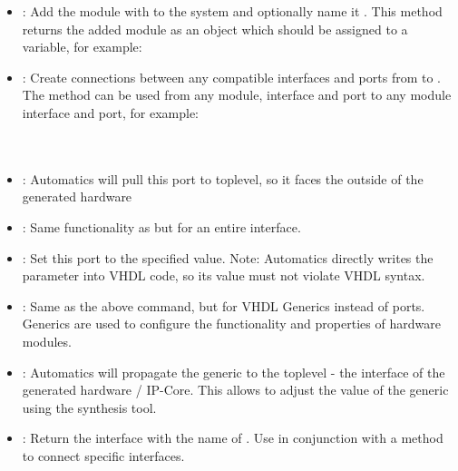 \begin{itemize}
\item {}: Add the module with  to the system and optionally name it .
This method returns the added module as an object which should be assigned to a variable, for example:
\item {}: Create connections between any compatible interfaces and ports from  to .
The  method can be used from any module, interface and port to any module interface and port, for example:\\
\\
\\
\item {}: Automatics will pull this port to toplevel, so it faces the outside of the generated hardware
\item {}: Same functionality as  but for an entire interface.
\item {}: Set this port to the specified value. Note: Automatics directly writes the parameter  into VHDL code, so its value must not violate VHDL syntax.
\item {}: Same as the above command, but for VHDL Generics instead of ports. Generics are used to configure the functionality and properties of hardware modules.
\item {}: Automatics will propagate the generic to the toplevel - the interface of the generated hardware / IP-Core.
This allows to adjust the value of the generic using the synthesis tool.
\item {}: Return the interface with the name  of . Use in conjunction with a  method to connect specific interfaces.

\end{itemize}
